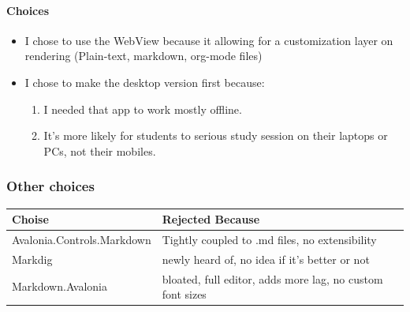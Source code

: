 \documentclass[14pt]{article}
\begin{document}
\paragraph{Choices}
\label{sec:orgdef3168}
\begin{itemize}
\item I chose to use the WebView because it allowing for  a customization layer on rendering (Plain-text, markdown, org-mode files)
\item I chose to make the desktop version first because:
\begin{enumerate}
\item I needed that app to work mostly offline.
\item It's more likely for students to serious study session on their laptops or PCs, not their mobiles.
\end{enumerate}
\end{itemize}


\newpage
\subsubsection{Other choices}
\label{sec:org2862994}
\begin{center}
\begin{tabular}{ll}
Choise & Rejected Because\\
\hline
Avalonia.Controls.Markdown & Tightly coupled to .md files, no extensibility\\
Markdig & newly heard of, no idea if it's better or not\\
Markdown.Avalonia & bloated, full editor, adds more lag, no custom font sizes\\
\end{tabular}
\end{center}
\end{document}
